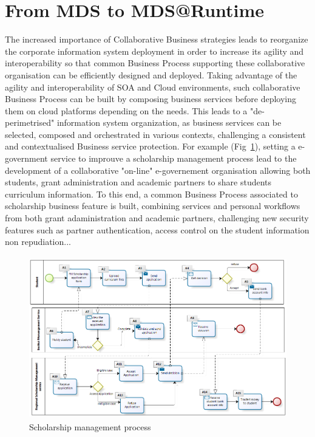 \documentclass[runningheads,a4paper]{llncs}
\begin{document}
\section{From MDS to MDS@Runtime}
The increased importance of Collaborative Business strategies leads to reorganize the corporate information system deployment in order to increase its agility and interoperability so that common Business Process supporting these collaborative organisation can be efficiently designed and deployed. Taking advantage of the agility and interoperability of SOA and Cloud environments, such collaborative Business Process can be built by composing business services before deploying them on cloud platforms depending on the needs. This leads to a "de-perimetrised" information system organization, as business services can be selected,  composed and orchestrated in various contexts, challenging a consistent and contextualised Business service protection.
For example (Fig~\ref{fig:bp}), setting a e-government service to improuve a scholarship management process
 lead to the development of a collaborative "on-line" e-governement organisation allowing both students, grant administration and academic partners to share students curriculum information. To this end, a common Business Process associated to scholarship business feature is built, combining services and personal workflows from both grant adaministration and academic partners, challenging new security features such as partner authentication, access control on the student information non repudiation...  

\begin{figure}  
\centering
\includegraphics[height=200pt, width=320pt]{BRPE_Eng.png}
\caption{Scholarship management process}
\label{fig:bp}
\end{figure}
\end{document}

